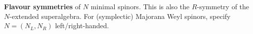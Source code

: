 \documentclass[10pt,letterpaper]{article}
\renewcommand{\paragraph}[1]{\textbf{#1}}
\begin{document}
\paragraph{Flavour symmetries} of $N$ minimal spinors.
This is also the $R$-symmetry of the $N$-extended superalgebra.
For (symplectic) Majorana Weyl spinors, specify $N=(N_L,N_R)$ left/right-handed.
\begin{center}
\vspace{-.5\baselineskip}
\end{center}
\end{document}
